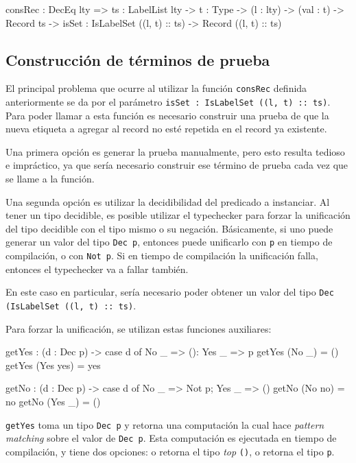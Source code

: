 \begin{code}
consRec : DecEq lty => {ts : LabelList lty} ->
  {t : Type} -> (l : lty) -> (val : t) ->
  Record ts -> {isSet : IsLabelSet ((l, t) :: ts)} ->
  Record ((l, t) :: ts)
\end{code}

\subsection{Construcción de términos de prueba}

El principal problema que ocurre al utilizar la función \texttt{consRec} definida anteriormente se da por el parámetro \texttt{isSet : IsLabelSet ((l, t) :: ts)}. Para poder llamar a esta función es necesario construir una prueba de que la nueva etiqueta a agregar al record no esté repetida en el record ya existente.

Una primera opción es generar la prueba manualmente, pero esto resulta tedioso e impráctico, ya que sería necesario construir ese término de prueba cada vez que se llame a la función.

Una segunda opción es utilizar la decidibilidad del predicado a instanciar. Al tener un tipo decidible, es posible utilizar el typechecker para forzar la unificación del tipo decidible con el tipo mismo o su negación. Básicamente, si uno puede generar un valor del tipo \texttt{Dec p}, entonces puede unificarlo con \texttt{p} en tiempo de compilación, o con \texttt{Not p}. Si en tiempo de compilación la unificación falla, entonces el typechecker va a fallar también.

En este caso en particular, sería necesario poder obtener un valor del tipo \texttt{Dec (IsLabelSet ((l, t) :: ts)}.

Para forzar la unificación, se utilizan estas funciones auxiliares:

\begin{code}
getYes : (d : Dec p) ->
  case d of { No _ => (): Yes _ => p }
getYes (No _) = ()
getYes (Yes yes) = yes

getNo : (d : Dec p) ->
  case d of { No _ => Not p; Yes _ => () }
getNo (No no) = no
getNo (Yes _) = ()
\end{code}

\texttt{getYes} toma un tipo \texttt{Dec p} y retorna una computación la cual hace \textit{pattern matching} sobre el valor de \texttt{Dec p}. Esta computación es ejecutada en tiempo de compilación, y tiene dos opciones: o retorna el tipo \textit{top} \texttt{()}, o retorna el tipo \texttt{p}.

